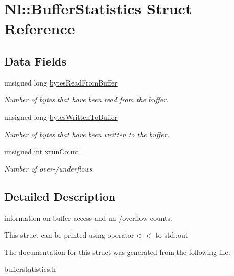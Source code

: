 \hypertarget{structNl_1_1BufferStatistics}{\section{Nl\-:\-:Buffer\-Statistics Struct Reference}
\label{structNl_1_1BufferStatistics}
}
\subsection*{Data Fields}
\begin{DoxyCompactItemize}
\item 
\hypertarget{structNl_1_1BufferStatistics_a54af55bf586df1a2c2e650f03b00692b}{unsigned long \hyperlink{structNl_1_1BufferStatistics_a54af55bf586df1a2c2e650f03b00692b}{bytes\-Read\-From\-Buffer}}\label{structNl_1_1BufferStatistics_a54af55bf586df1a2c2e650f03b00692b}

\begin{DoxyCompactList}\small\item\em Number of bytes that have been read from the buffer. \end{DoxyCompactList}\item 
\hypertarget{structNl_1_1BufferStatistics_aa3b2e11bb9ca059ee93feb45ea63b1b4}{unsigned long \hyperlink{structNl_1_1BufferStatistics_aa3b2e11bb9ca059ee93feb45ea63b1b4}{bytes\-Written\-To\-Buffer}}\label{structNl_1_1BufferStatistics_aa3b2e11bb9ca059ee93feb45ea63b1b4}

\begin{DoxyCompactList}\small\item\em Number of bytes that have been written to the buffer. \end{DoxyCompactList}\item 
\hypertarget{structNl_1_1BufferStatistics_ab79a6df77c737bccda56906766724975}{unsigned int \hyperlink{structNl_1_1BufferStatistics_ab79a6df77c737bccda56906766724975}{xrun\-Count}}\label{structNl_1_1BufferStatistics_ab79a6df77c737bccda56906766724975}

\begin{DoxyCompactList}\small\item\em Number of over-\//underflows. \end{DoxyCompactList}\end{DoxyCompactItemize}


\subsection{Detailed Description}
information on buffer access and un-\//overflow counts.

This struct can be printed using operator$<$$<$ to std\-::out 

The documentation for this struct was generated from the following file\-:\begin{DoxyCompactItemize}
\item 
bufferstatistics.\-h\end{DoxyCompactItemize}
